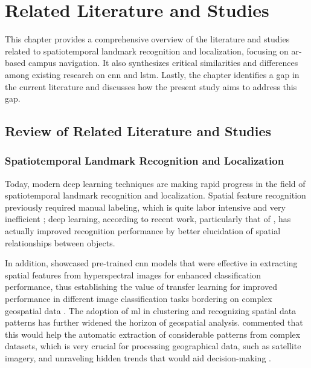 
\chapter{Related Literature and Studies}
\begin{refsection}

This chapter provides a comprehensive overview of the literature and studies related to spatiotemporal landmark recognition and localization, focusing on \gls{ar}-based campus navigation. It also synthesizes critical similarities and differences among existing research on \gls{cnn} and \gls{lstm}. Lastly, the chapter identifies a gap in the current literature and discusses how the present study aims to address this gap.

\section{Review of Related Literature and Studies}

\subsection{Spatiotemporal Landmark Recognition and Localization}

Today, modern deep learning techniques are making rapid progress in the field of spatiotemporal landmark recognition and localization. Spatial feature recognition previously required manual labeling, which is quite labor intensive and very inefficient \cite{three}; deep learning, according to recent work, particularly that of \citeauthor{three} \citeyear{three}, has actually improved recognition performance by better elucidation of spatial relationships between objects. 

In addition, \citeauthor{six} \citeyear{six} showcased pre-trained \gls{cnn} models that were effective in extracting spatial features from hyperspectral images for enhanced classification performance, thus establishing the value of transfer learning for improved performance in different image classification tasks bordering on complex geospatial data \cite{six}. The adoption of \gls{ml} in clustering and recognizing spatial data patterns has further widened the horizon of geospatial analysis. \citeauthor{seven} \citeyear{seven} commented that this would help the automatic extraction of considerable patterns from complex datasets, which is very crucial for processing geographical data, such as satellite imagery, and unraveling hidden trends that would aid decision-making \cite{seven}.


\end{refsection}
